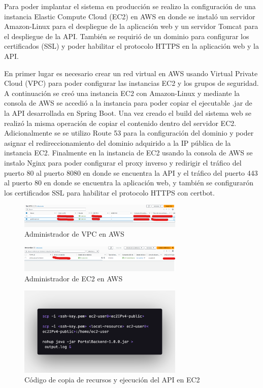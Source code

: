 Para poder implantar el sistema en producción se realizo la configuración de una instancia Elastic Compute Cloud (EC2) en AWS en donde se instaló un servidor Amazon-Linux para el despliegue de la aplicación web y un servidor Tomcat para el despliegue de la API.
También se requirió de un dominio para configurar los certificados (SSL) y poder habilitar el protocolo HTTPS en la aplicación web y la API.

En primer lugar es necesario crear un red virtual en AWS usando Virtual Private Cloud (VPC) para poder configurar las instancias EC2 y los grupos de seguridad.
A continuación se creó una instancia EC2 con Amazon-Linux y mediante la consola de AWS se accedió a la instancia para poder copiar el ejecutable .jar de la API desarrollada en Spring Boot.
Una vez creado el build del sistema web se realizó la misma operación de copiar el contenido dentro del servidor EC2.
Adicionalmente se se utilizo Route 53 para la configuración del dominio y poder asignar el redireccionamiento del dominio adquirido a la IP pública de la instancia EC2.
Finalmente en la instancia de EC2 usando la consola de AWS se instalo Nginx para poder configurar el proxy inverso y redirigir el tráfico del puerto 80 al puerto 8080 en donde se encuentra la API y el tráfico del puerto 443 al puerto 80 en donde se encuentra la aplicación web, y también se configurarón los certificados SSL para habilitar el protocolo HTTPS con certbot.

\begin{figure}[H]
    \centering
    \includegraphics[width=0.7\textwidth]{resources/images/aws-vpc}
    \caption{Administrador de VPC en AWS}
    \label{fig:vpc}
\end{figure}

\begin{figure}[H]
    \centering
    \includegraphics[width=0.7\textwidth]{resources/images/aws-ec2}
    \caption{Administrador de EC2 en AWS}
    \label{fig:ec2}
\end{figure}

\begin{figure}[H]
    \centering
    \includegraphics[width=0.7\textwidth]{resources/images/aws-ec2-code}
    \caption{Código de copia de recursos y ejecución del API en EC2}
    \label{fig:ec2-code}
\end{figure}

